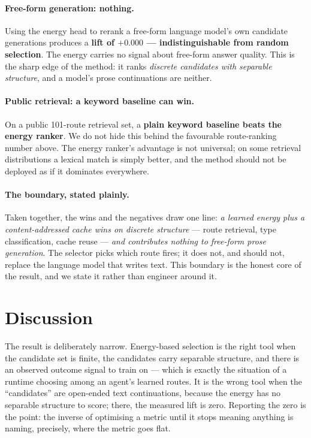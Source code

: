 \documentclass[11pt]{article}
\begin{document}
\paragraph{Free-form generation: nothing.} Using the energy head to rerank a
free-form language model's own candidate generations produces a \textbf{lift of
$+0.000$ --- indistinguishable from random selection}. The energy carries no signal
about free-form answer quality. This is the sharp edge of the method: it ranks
\emph{discrete candidates with separable structure}, and a model's prose
continuations are neither.

\paragraph{Public retrieval: a keyword baseline can win.} On a public 101-route
retrieval set, a \textbf{plain keyword baseline beats the energy ranker}. We do not
hide this behind the favourable route-ranking number above. The energy ranker's
advantage is not universal; on some retrieval distributions a lexical match is
simply better, and the method should not be deployed as if it dominates everywhere.

\paragraph{The boundary, stated plainly.} Taken together, the wins and the
negatives draw one line: \emph{a learned energy plus a content-addressed cache wins
on discrete structure} --- route retrieval, type classification, cache reuse ---
\emph{and contributes nothing to free-form prose generation}. The selector picks
which route fires; it does not, and should not, replace the language model that
writes text. This boundary is the honest core of the result, and we state it rather
than engineer around it.

\section{Discussion}
The result is deliberately narrow. Energy-based selection is the right tool when the
candidate set is finite, the candidates carry separable structure, and there is an
observed outcome signal to train on --- which is exactly the situation of a runtime
choosing among an agent's learned routes. It is the wrong tool when the ``candidates''
are open-ended text continuations, because the energy has no separable structure to
score; there, the measured lift is zero. Reporting the zero is the point: the
inverse of optimising a metric until it stops meaning anything is naming, precisely,
where the metric goes flat.
\end{document}
